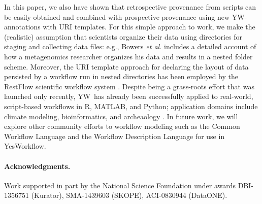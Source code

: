 \documentclass[letterpaper,twocolumn,10pt]{article}
\newcommand{\YW}{\textsf{YesWorkflow}}
\newcommand{\yw}{\textsf{YW}}
\newcommand{\R}{\textsf{R}}
\newcommand{\MATLAB}{\textsf{MATLAB}}
\begin{document}
In this paper, we also have shown that retrospective provenance from
scripts can be easily obtained and combined with prospective
provenance using new \yw-annotations with URI templates. For this
simple approach to work, we make the (realistic) assumption that
scientists organize their data using directories for staging and
collecting data files: e.g., Bowers \emph{et al.}
\cite{bowers2007project} includes a detailed account of how a
metagenomics researcher organizes his data and results in a nested
folder scheme. Moreover, the URI template approach for declaring the
layout of data persisted by a workflow run in nested directories has
been employed by the RestFlow scientific workflow system
\cite{tsai2013autodrug}.
Despite being a grass-roots effort that was launched only recently,
\yw\ has already been successfully applied to real-world, script-based
workflows in \R, \MATLAB, and Python; application domains include
climate modeling, bioinformatics, and archeaology
\cite{mcphillips2015ywIJDC}.
In future work, we will explore other community efforts to workflow
modeling such as the Common Workflow Language \cite{amstutz15CDL} and
the Workflow Description Language \cite{frazer15WDL} for use in \YW.

\paragraph{Acknowledgments.}
Work supported in part by the National Science Foundation under awards
DBI-1356751 (Kurator), SMA-1439603 (SKOPE), ACI-0830944 (DataONE).



\footnotesize

\end{document}
